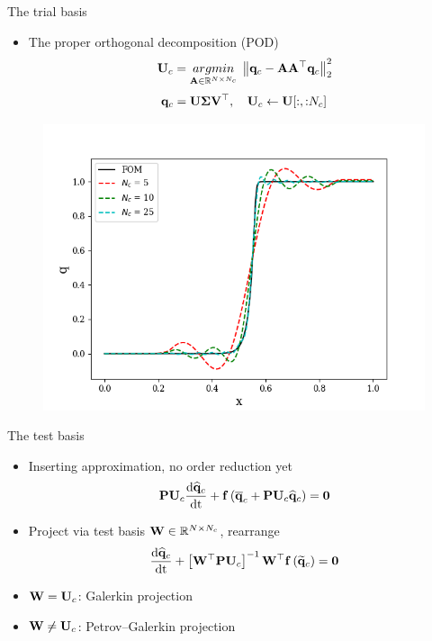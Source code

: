 \documentclass[]{beamer}
\begin{document}
\begin{frame}{The trial basis}
    \begin{itemize}
        \item The proper orthogonal decomposition (POD)
        \begin{equation*}
            \consTrial = \argmin{\dummyMatOne \in \mathbb{R}^{\numDOF \times \numConsvModes}} \norm{\consDataMat - \dummyMatOne \dummyMatOne^\top \consDataMat}_2^2
        \end{equation*}
        \begin{equation*}
            \consDataMat = \basisMat \singVecMat \rightSingVecMat^\top, \quad \consTrial \leftarrow \basisMat[:, {:}\numConsvModes]
        \end{equation*}
    \end{itemize}
	\vspace{-1em}
	\centering
	\begin{figure}
		\includegraphics[width=0.6\linewidth]{podProfileConverge.png}
	\end{figure}
\end{frame}

\begin{frame}{The test basis}
    \begin{itemize}
        \item Inserting approximation, no order reduction yet
        \begin{equation*}
            \consScale \consTrial \ode{\consVecCoef}{\timeVar} + \rhsFunc{\consVecCent + \consScale \consTrial \consVecCoef} = \zeroVec 
        \end{equation*}
        \item Project via test basis $\testBasis \in \mathbb{R}^{\numDOF \times \numConsvModes}$, rearrange
        \begin{equation*}
            \ode{\consVecCoef}{\timeVar} + \left[ \testBasis^\top \consScale \consTrial \right]^{-1} \testBasis^\top \rhsFunc{\consVecRom} = \zeroVec
        \end{equation*}
        \item $\testBasis = \consTrial$: Galerkin projection
        \item $\testBasis \neq \consTrial$: Petrov--Galerkin projection 
    \end{itemize}
\end{frame}
\end{document}
